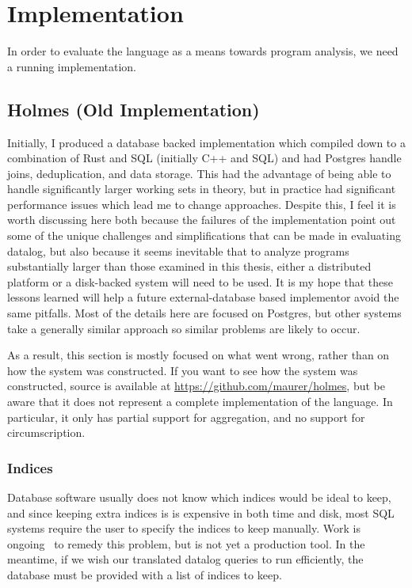 \section{Implementation}
\label{holmes:sec:impl}
In order to evaluate the language as a means towards program analysis, we need a running implementation.
\subsection{Holmes (Old Implementation)}
Initially, I produced a database backed implementation which compiled down to a combination of Rust and SQL (initially C++ and SQL) and had Postgres handle joins, deduplication, and data storage.
This had the advantage of being able to handle significantly larger working sets in theory, but in practice had significant performance issues which lead me to change approaches.
Despite this, I feel it is worth discussing here both because the failures of the implementation point out some of the unique challenges and simplifications that can be made in evaluating datalog, but also because it seems inevitable that to analyze programs substantially larger than those examined in this thesis, either a distributed platform or a disk-backed system will need to be used.
It is my hope that these lessons learned will help a future external-database based implementor avoid the same pitfalls.
Most of the details here are focused on Postgres, but other systems take a generally similar approach so similar problems are likely to occur.

As a result, this section is mostly focused on what went wrong, rather than on how the system was constructed.
If you want to see how the system was constructed, source is available at \url{https://github.com/maurer/holmes}, but be aware that it does not represent a complete implementation of the language.
In particular, it only has partial support for aggregation, and no support for circumscription.

\subsubsection{Indices}
Database software usually does not know which indices would be ideal to keep, and since keeping extra indices is is expensive in both time and disk, most SQL systems require the user to specify the indices to keep manually.
Work is ongoing~\cite{peloton} to remedy this problem, but is not yet a production tool.
In the meantime, if we wish our translated datalog queries to run efficiently, the database must be provided with a list of indices to keep.

